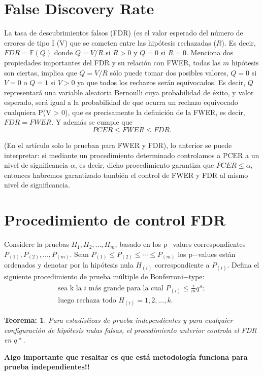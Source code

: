 \documentclass[11pt,letterpaper]{article}
\newcommand{\mE}{\mathbb{E}}
\newtheorem{thmt}{Teorema:}
\begin{document}
\section{False Discovery Rate}
La tasa de descubrimientos falsos (FDR) (es el valor esperado del número de errores de tipo I (V) que se cometen entre las hipótesis rechazadas ($R$). Es decir, $FDR = \mE(Q)$ donde $Q = V/R$ si $R > 0$ y $Q = 0$ si $R = 0$.
Menciona dos propiedades importantes del FDR y su relación con FWER, todas las $m$ hipótesis son ciertas, implica que  $Q = V/R$ sólo puede tomar dos posibles valores, $Q = 0$ si $V = 0$ o $Q = 1$ si $V > 0$ ya que todos los rechazos serán equivocados. Es decir, $Q$ representará una variable aleatoria Bernoulli cuya probabilidad de éxito, y valor esperado, será igual a la probabilidad de que ocurra un
rechazo equivocado cualquiera P(V > 0), que es precisamente la definición de la FWER, es decir, $FDR =FWER$. Y además se cumple que $$ PCER \leq FWER \leq FDR.$$

(En el artículo solo lo prueban para FWER y FDR), lo anterior se puede interpretar: si mediante un procedimiento determinado controlamos a PCER a un nivel de significancia $\alpha$, es decir, dicho procedimiento garantiza que $PCER\leq \alpha$, entonces habremos garantizado también el control de FWER y FDR al mismo nivel de significancia.

\section{Procedimiento de control FDR}
Considere la pruebas $H_1, H_2, ..., H_m$, basado en los p$-$values correspondientes $P_{(1)}, P_{(2)},..., P_{(m)}$. Sean $P_{(1)}\leq P_{(2)}\leq \cdots \leq  P_{(m)}$ los p$-$values están ordenados y denotar por la hipótesis nula $H_{(i)}$ correspondiente a $P_{(i)}$. Defina el siguiente procedimiento de prueba múltiple de Bonferroni$-$type:\\
\begin{align}
 \text{sea k la $i$ más grande para la cual }P_{(i)}\leq \frac{i}{m}q*;\\
 \text{luego rechaza todo }H_{(i)} = 1, 2, ..., k.
\end{align} 

\begin{framed}
    \begin{thmt} \label{t_1}
Para estadísticas de prueba independientes y para cualquier configuración de hipótesis nulas falsas, el procedimiento anterior controla el FDR en $q*$.
    \end{thmt}
\end{framed}
\textbf{Algo importante que resaltar es que está metodología funciona para prueba independientes!!}
\end{document}

